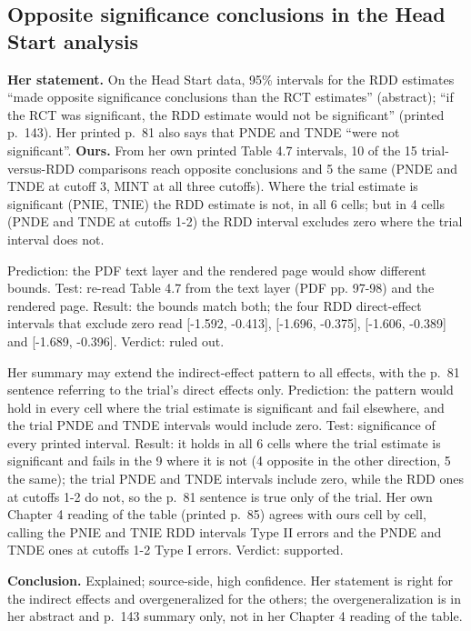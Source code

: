 \subsection{Opposite significance conclusions in the Head Start analysis}\label{dis:significance-conclusions}

\textbf{Her statement.} On the Head Start data, 95\% intervals for the RDD estimates ``made opposite significance conclusions than the RCT estimates'' (abstract); ``if the RCT was significant, the RDD estimate would not be significant'' (printed p.~143). Her printed p.~81 also says that PNDE and TNDE ``were not significant''. \textbf{Ours.} From her own printed Table 4.7 intervals, 10 of the 15 trial-versus-RDD comparisons reach opposite conclusions and 5 the same (PNDE and TNDE at cutoff 3, MINT at all three cutoffs). Where the trial estimate is significant (PNIE, TNIE) the RDD estimate is not, in all 6 cells; but in 4 cells (PNDE and TNDE at cutoffs 1-2) the RDD interval excludes zero where the trial interval does not.
\begin{description}[leftmargin=1em,style=nextline]
\item[We transcribed the intervals wrongly (ours).] Prediction: the PDF text layer and the rendered page would show different bounds. Test: re-read Table 4.7 from the text layer (PDF pp. 97-98) and the rendered page. Result: the bounds match both; the four RDD direct-effect intervals that exclude zero read [-1.592, -0.413], [-1.696, -0.375], [-1.606, -0.389] and [-1.689, -0.396]. Verdict: ruled out.
\item[Her summary generalizes from the indirect effects (source).] Her summary may extend the indirect-effect pattern to all effects, with the p.~81 sentence referring to the trial's direct effects only. Prediction: the pattern would hold in every cell where the trial estimate is significant and fail elsewhere, and the trial PNDE and TNDE intervals would include zero. Test: significance of every printed interval. Result: it holds in all 6 cells where the trial estimate is significant and fails in the 9 where it is not (4 opposite in the other direction, 5 the same); the trial PNDE and TNDE intervals include zero, while the RDD ones at cutoffs 1-2 do not, so the p.~81 sentence is true only of the trial. Her own Chapter 4 reading of the table (printed p.~85) agrees with ours cell by cell, calling the PNIE and TNIE RDD intervals Type II errors and the PNDE and TNDE ones at cutoffs 1-2 Type I errors. Verdict: supported.
\end{description}
\textbf{Conclusion.} Explained; source-side, high confidence. Her statement is right for the indirect effects and overgeneralized for the others; the overgeneralization is in her abstract and p.~143 summary only, not in her Chapter 4 reading of the table.


